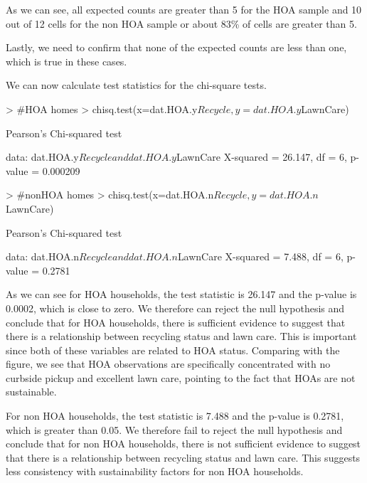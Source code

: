 \documentclass{article}
\begin{document}
As we can see, all expected counts are greater than 5 for the HOA sample and 10 out of 12 cells for the non HOA sample or about 83\% of cells are greater than 5.

Lastly, we need to confirm that none of the expected counts are less than one, which is true in these cases. 

We can now calculate test statistics for the chi-square tests. 
\begin{Schunk}
\begin{Sinput}
> #HOA homes
> chisq.test(x=dat.HOA.y$Recycle,y=dat.HOA.y$LawnCare)
\end{Sinput}
\begin{Soutput}
	Pearson's Chi-squared test

data:  dat.HOA.y$Recycle and dat.HOA.y$LawnCare
X-squared = 26.147, df = 6, p-value = 0.000209
\end{Soutput}
\begin{Sinput}
> #nonHOA homes
> chisq.test(x=dat.HOA.n$Recycle,y=dat.HOA.n$LawnCare)
\end{Sinput}
\begin{Soutput}
	Pearson's Chi-squared test

data:  dat.HOA.n$Recycle and dat.HOA.n$LawnCare
X-squared = 7.488, df = 6, p-value = 0.2781
\end{Soutput}
\end{Schunk}

As we can see for HOA households, the test statistic is 26.147 and the p-value is 0.0002, which is close to zero. We therefore can reject the null hypothesis and conclude that for HOA households, there is sufficient evidence to suggest that there is a relationship between recycling status and lawn care. This is important since both of these variables are related to HOA status. Comparing with the figure, we see that HOA observations are specifically concentrated with no curbside pickup and excellent lawn care, pointing to the fact that HOAs are not sustainable.

For non HOA households, the test statistic is 7.488 and the p-value is 0.2781, which is greater than 0.05. We therefore fail to reject the null hypothesis and conclude that for non HOA households, there is not sufficient evidence to suggest that there is a relationship between recycling status and lawn care. This suggests less consistency with sustainability factors for non HOA households.
\end{document}
